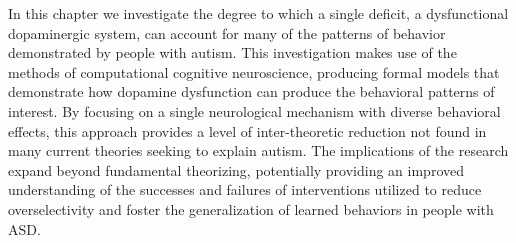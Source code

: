 \documentclass[man]{apa}
\begin{document}

In this chapter we investigate the degree to which a single deficit, a dysfunctional dopaminergic system, can account for many of the patterns of behavior demonstrated by people with autism.  This investigation makes use of the methods of computational cognitive neuroscience, producing formal models that demonstrate how dopamine dysfunction can produce the behavioral patterns of interest.  By focusing on a single neurological mechanism with diverse behavioral effects, this approach provides a level of inter-theoretic reduction not found in many current theories seeking to explain autism.  The implications of the research expand beyond fundamental theorizing, potentially providing an improved understanding of the successes and failures of interventions utilized to reduce overselectivity and foster the generalization of learned behaviors in people with ASD.
\end{document}
